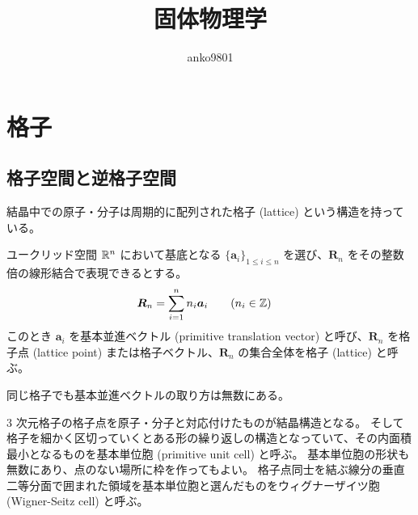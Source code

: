 \documentclass[uplatex,dvipdfmx,a4paper,11pt]{jlreq}
\title{固体物理学}
\author{anko9801}
\newcommand{\R}{\bm{R}}
\renewcommand{\aa}{\bm{a}}
\begin{document}
\maketitle
\tableofcontents
\clearpage

\section{格子}

\subsection{格子空間と逆格子空間}
結晶中での原子・分子は周期的に配列された格子 (lattice) という構造を持っている。
\begin{definition}[格子]
  ユークリッド空間 $\mathbb{R}^n$ において基底となる $\{\aa_i\}_{1\leq i\leq n}$ を選び、$\R_n$ をその整数倍の線形結合で表現できるとする。
  \begin{align}
    \R_n & = \sum_{i = 1}^n n_i\aa_i \qquad (n_i\in\ZZ)
  \end{align}
  このとき $\aa_i$ を基本並進ベクトル (primitive translation vector) と呼び、$\R_n$ を格子点 (lattice point) または格子ベクトル、$\R_n$ の集合全体を格子 (lattice) と呼ぶ。
\end{definition}
\begin{theorem}
  同じ格子でも基本並進ベクトルの取り方は無数にある。\\
\end{theorem}

3 次元格子の格子点を原子・分子と対応付けたものが結晶構造となる。
そして格子を細かく区切っていくとある形の繰り返しの構造となっていて、その内面積最小となるものを基本単位胞 (primitive unit cell) と呼ぶ。
基本単位胞の形状も無数にあり、点のない場所に枠を作ってもよい。
格子点同士を結ぶ線分の垂直二等分面で囲まれた領域を基本単位胞と選んだものをウィグナーザイツ胞 (Wigner-Seitz cell) と呼ぶ。 \\
\end{document}
